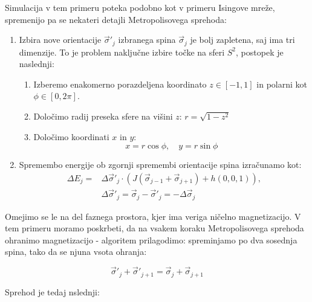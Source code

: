 \documentclass[a4paper]{article}
\newcommand{\s}{\sigma}
\newcommand{\vs}{\vec{\s}}
\newcommand{\D}{\Delta}
\begin{document}
    Simulacija v tem primeru poteka podobno kot v primeru Isingove mreže, spremenijo pa se nekateri detajli
    Metropolisovega sprehoda:

    \begin{enumerate}
        \item Izbira nove orientacije $\vs'_j$ izbranega spina $\vs_j$ je bolj zapletena, saj ima tri dimenzije.
        To je problem naključne izbire točke na sferi $S^2$, postopek je naslednji:
        \begin{enumerate}
            \item Izberemo enakomerno porazdeljena koordinato $z \in [-1, 1]$ in polarni kot $\phi \in [0, 2\pi]$.
            \item Določimo radij preseka sfere na višini $z$: $r = \sqrt{1 - z^2}$
            \item Določimo koordinati $x$ in $y$:
            \begin{equation}\label{eq9}
                x = r\cos{\phi}, \quad y = r\sin{\phi}
            \end{equation}
        \end{enumerate}
        \item Spremembo energije ob zgornji spremembi orientacije spina izračunamo kot:
        \begin{equation}\label{eq10}
            \begin{split}
                \D E_j = &\D \vs'_j \cdot \left( J(\vs_{j-1} + \vs_{j+1}) + h(0, 0, 1) \right), \\
                &\D \vs'_j = \vs_j - \vs'_j = -\D \vs_j
            \end{split}
        \end{equation}
    \end{enumerate}

    Omejimo se le na del faznega prostora, kjer ima veriga ničelno magnetizacijo.
    V tem primeru moramo poskrbeti, da na vsakem koraku Metropolisovega sprehoda ohranimo magnetizacijo - algoritem
    prilagodimo: spreminjamo po dva sosednja spina, tako da se njuna vsota ohranja:

    \begin{equation}\label{eq11}
        \vs'_j + \vs'_{j+1} = \vs_j + \vs_{j+1}
    \end{equation}

    Sprehod je tedaj nslednji:
\end{document}
